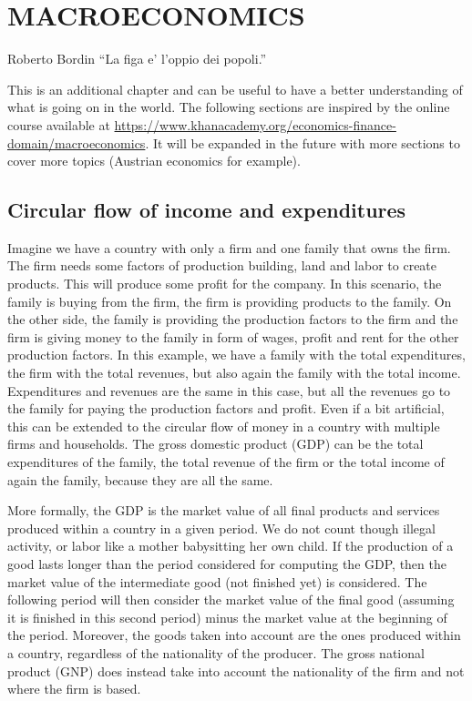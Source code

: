\chapter{MACROECONOMICS}
\begin{chapquote}{Roberto Bordin}
``La figa e' l'oppio dei popoli.''
\end{chapquote}

This is an additional chapter and can be useful to have a better understanding of what is going on in the world. The following sections are inspired by the online course available at \url{https://www.khanacademy.org/economics-finance-domain/macroeconomics}. It will be expanded in the future with more sections to cover more topics (Austrian economics for example).

\section{Circular flow of income and expenditures}
Imagine we have a country with only a firm and one family that owns the firm. The firm needs some factors of production building, land and labor to create products. This will produce some profit for the company. In this scenario, the family is buying from the firm, the firm is providing products to the family. On the other side, the family is providing the production factors to the firm and the firm is giving money to the family in form of wages, profit and rent for the other production factors. In this example, we have a family with the total expenditures, the firm with the total revenues, but also again the family with the total income. Expenditures and revenues are the same in this case, but all the revenues go to the family for paying the production factors and profit. Even if a bit artificial, this can be extended to the circular flow of money in a country with multiple firms and households. The gross domestic product (GDP) can be the total expenditures of the family, the total revenue of the firm or the total income of again the family, because they are all the same.

More formally, the GDP is the market value of all final products and services produced within a country in a given period. We do not count though illegal activity, or labor like a mother babysitting her own child. If the production of a good lasts longer than the period considered for computing the GDP, then the market value of the intermediate good (not finished yet) is considered. The following period will then consider the market value of the final good (assuming it is finished in this second period) minus the market value at the beginning of the period. Moreover, the goods taken into account are the ones produced within a country, regardless of the nationality of the producer. The gross national product (GNP) does instead take into account the nationality of the firm and not where the firm is based.

